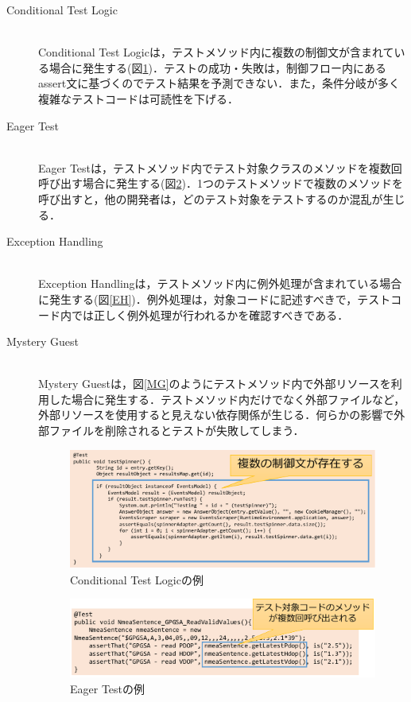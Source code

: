 \documentclass[12pt]{jarticle} %
\begin{document}
\begin{description}
\newpage
\item[Conditional Test Logic]~\\
Conditional Test Logicは，テストメソッド内に複数の制御文が含まれている場合に発生する(図\ref{CTL})．テストの成功・失敗は，制御フロー内にあるassert文に基づくのでテスト結果を予測できない．また，条件分岐が多く複雑なテストコードは可読性を下げる．



\item[Eager Test]~\\
Eager Testは，テストメソッド内でテスト対象クラスのメソッドを複数回呼び出す場合に発生する(図\ref{ET})．1つのテストメソッドで複数のメソッドを呼び出すと，他の開発者は，どのテスト対象をテストするのか混乱が生じる．


\item[Exception Handling]~\\
Exception Handlingは，テストメソッド内に例外処理が含まれている場合に発生する(図\ref{EH})．例外処理は，対象コードに記述すべきで，テストコード内では正しく例外処理が行われるかを確認すべきである．

\item[Mystery Guest]~\\
Mystery Guestは，図\ref{MG}のようにテストメソッド内で外部リソースを利用した場合に発生する．テストメソッド内だけでなく外部ファイルなど，外部リソースを使用すると見えない依存関係が生じる．何らかの影響で外部ファイルを削除されるとテストが失敗してしまう．

\begin{figure}[htbp]
\begin{center}
\includegraphics[clip,width=15cm]{CTL.pdf}
\caption{Conditional Test Logicの例}
\label{CTL}
\end{center}
\end{figure}

\begin{figure}[htbp]
\begin{center}
\includegraphics[clip,width=15cm]{ET.pdf}
\caption{Eager Testの例}
\label{ET}
\end{center}
\end{figure}


\end{description}
\end{document}
